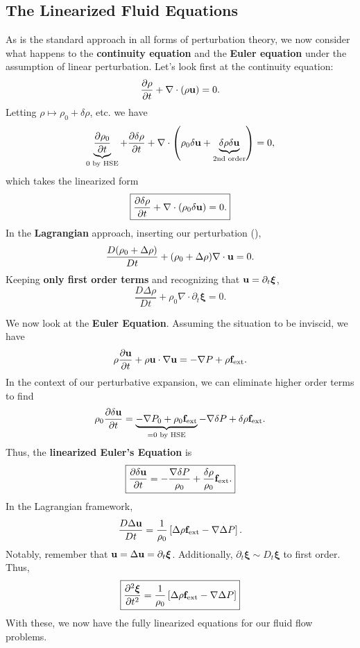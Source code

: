 \subsection{The Linearized Fluid Equations}

As is the standard approach in all forms of perturbation theory, we now consider what happens to the \textbf{continuity equation} and the \textbf{Euler equation} under the assumption of linear perturbation. Let's look first at the continuity equation:
\[
\frac{\partial \rho}{\partial t} + \nabla \cdot (\rho{\bf u}) = 0.
\]
Letting $\rho \mapsto \rho_0 + \delta \rho$, etc. we have
\[
\underbrace{\frac{\partial \rho_0}{\partial t}}_{\text{0 by HSE}} + \frac{\partial \delta \rho}{\partial t} + \nabla \cdot \left(\rho_0\delta{\bf u}+ \underbrace{\delta \rho \delta {\bf u}}_{\text{2nd order}}\right) = 0,
\]
which takes the linearized form
\begin{equation}
    \label{eq:linear_continuity_euler}
    \boxed{
    \frac{\partial \delta \rho}{\partial t} + \nabla \cdot(\rho_0 {\bf \delta u}) = 0.
    }
\end{equation}
In the \textbf{Lagrangian} approach, inserting our perturbation (),
\[
\frac{D(\rho_0 + \Delta \rho)}{Dt} + (\rho_0 + \Delta \rho) \nabla \cdot {\bf u{}} = 0 .
\]
Keeping \textbf{only first order terms} and recognizing that ${\bf u} = \partial_t \boldsymbol{\xi}$,
\begin{equation}
    \label{eq:linear_continuity_lagrangian}
    \boxed{
    \frac{D\Delta \rho}{Dt} + \rho_0 \nabla \cdot \partial_t \boldsymbol{\xi} = 0.
    }
\end{equation}
\par
We now look at the \textbf{Euler Equation}. Assuming the situation to be inviscid, we have
\[
\rho \frac{\partial {\bf u}}{\partial t} + \rho {\bf u} \cdot \nabla {\bf u} = -\nabla P+ \rho{\bf f}_{\rm ext}.
\]
In the context of our perturbative expansion, we can eliminate higher order terms to find
\[
\rho_0 \frac{\partial \delta {\bf u}}{\partial t} = \underbrace{-\nabla P_0 + \rho_0{\bf f}_{\rm ext}}_{\text{=0 by HSE}} - \nabla \delta P + \delta \rho {\bf f}_{\rm ext}.
\]
Thus, the \textbf{linearized Euler's Equation} is
\begin{equation}
    \label{eq:euler_linearized_eulerian}
    \boxed{
    \frac{\partial \delta {\bf u}}{\partial t} = - \frac{\nabla \delta P}{\rho_0} + \frac{\delta \rho}{\rho_0} {\bf f}_{\rm ext}.}
\end{equation}
In the Lagrangian framework,
\[
\frac{D\Delta {\bf u}}{Dt} = \frac{1}{\rho_0} \left[\Delta \rho {\bf f}_{\rm ext} - \nabla \Delta P\right].
\]
Notably, remember that ${\bf u} = \Delta {\bf u} = \partial_t \boldsymbol{\xi}$. Additionally, $\partial_t \boldsymbol{\xi} \sim D_t\boldsymbol{\xi}$ to first order. Thus,
\begin{equation}
\label{eq:euler_linearized_lagrangian}
\boxed{
\frac{\partial^2 \boldsymbol{\xi}}{\partial t^2} = \frac{1}{\rho_0} \left[\Delta \rho {\bf f}_{\rm ext} - \nabla \Delta P \right]}
\end{equation}
With these, we now have the fully linearized equations for our fluid flow problems.

